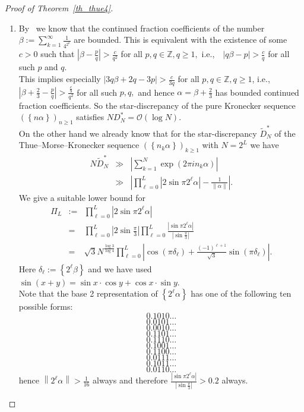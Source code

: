 \documentclass[12pt]{amsart}
\begin{document}
\begin{proof}[Proof of Theorem~\ref{th_thue4}]~\\
\begin{enumerate}
\item [a)] By~\cite{Sh2} we know that the continued fraction coefficients of the number $\beta := \sum^{\infty}_{k=1} \frac{1}{4^{2^{k}}}$ are bounded. This is equivalent with the existence of some $c > 0$ such that $\left|\beta-\frac{p}{q}\right|> \frac{c}{q^{2}}$ for all $p,q \in \mathbb{Z}, q \geq 1,$ i.e.,~~$\left|q \beta -p\right| > \frac{c}{q}$ for all such $p$ and $q$.\\

\noindent This implies especially $\left|3 q \beta+ 2 q-3 p\right| > \frac{c}{3 q}$ for all $p, q \in \mathbb{Z}, q \geq 1$, i.e.,\\
$\left|\beta + \frac{2}{3} - \frac{p}{q}\right| > \frac{\frac{c}{9}}{q^{2}}$ for all such $p,q,$ and hence $ \alpha= \beta + \frac{2}{3}$ has bounded continued fraction coefficients. So the star-discrepancy of the pure Kronecker sequence $\left(\left\{n \alpha\right\}\right)_{n \geq 1}$ satisfies $N D_{N}^{*}= \mathcal{O} \left(\log N\right).$\\

\noindent On the other hand we already know that for the star-discrepancy $\widetilde{D}_{N}^{*}$ of the Thue--Morse--Kronecker sequence $\left(\left\{n_{k} \alpha \right\}\right)_{k \geq 1}$ with $N= 2^{L}$ we have
\begin{eqnarray*}
N \widetilde{D}^{*}_{N} & \gg & \left|\sum^{N}_{k=1} \exp \left(2 \pi i n_{k} \alpha \right)\right| \\
& \gg & \left|\prod^{L}_{\ell=0} \left|2 \sin \pi 2^{\ell} \alpha \right|- \frac{1}{\left\|\alpha\right\|}\right|.
\end{eqnarray*}
We give a suitable lower bound for
\begin{eqnarray*}
\Pi_{L} & := & \prod^{L}_{\ell=0} \left|2 \sin \pi 2^{\ell} \alpha \right| \\
& = & \prod^{L}_{\ell=0} \left|2 \sin \frac{\pi}{3}\right| \prod^{L}_{\ell=0} \frac{\left|\sin \pi 2^{\ell} \alpha \right|}{\left|\sin \frac{\pi}{3}\right|} \\
& = & \sqrt{3} N^{\frac{\log3}{\log 4}} \prod^{L}_{\ell=0} \left|\cos \left(\pi \delta_{\ell}\right)+ \frac{\left(-1\right)^{\ell+1}}{\sqrt{3}} \sin \left(\pi \delta_{\ell}\right)\right|.
\end{eqnarray*}
Here $\delta_{\ell} := \left\{2^{\ell} \beta \right\}$ and we have used $\sin \left(x+y\right) = \sin x \cdot \cos y + \cos x \cdot \sin y.$\\
Note that the base 2 representation of $\left\{2^{\ell} \alpha \right\}$ has one of the following ten possible forms:
$$0.1010\ldots$$
$$0.0101 \ldots$$
$$0.0010 \ldots$$
$$0.1101\ldots$$
$$0.1110\ldots$$
$$0.1001 \ldots$$
$$0.1100 \ldots$$
$$0.0111 \ldots$$
$$0.1011 \ldots$$
$$0.0110 \ldots$$
hence $\left\|2^{\ell} \alpha \right\| > \frac{1}{16}$ always and therefore $\frac{\left|\sin \pi 2^{\ell} \alpha \right|}{\left|\sin \frac{\pi}{3}\right|} > 0.2$ always.\\


\end{enumerate}
\end{proof}
\end{document}

